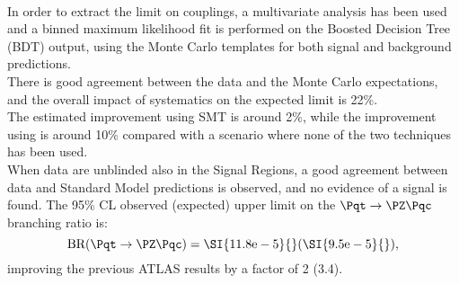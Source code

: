 \vspace{\baselineskip}
\\In order to extract the limit on \tZc couplings, a multivariate analysis has been used and a binned maximum likelihood fit is performed on the Boosted Decision Tree (BDT) output, using the Monte Carlo templates for both signal and background predictions.\\
There is good agreement between the data and the Monte Carlo expectations, 
and the overall impact of systematics on the expected limit is 22\%.\\
The estimated improvement using SMT is around 2\%, while the improvement using \DLrc is around 10\% compared with a scenario where none of the two techniques has been used.
\vspace{\baselineskip}
\\When data are unblinded also in the Signal Regions, a good agreement between data and Standard Model predictions is observed, and no evidence of a signal is found. The 95\% CL observed (expected) upper limit on the $\Pqt\rightarrow\PZ\Pqc$ branching ratio is:
\begin{equation*}
\mathrm{BR (\Pqt\rightarrow\PZ\Pqc)=\SI{11.8e-5}{}(\SI{9.5e-5}{})},
\end{equation*}
improving the previous ATLAS results by a factor of 2 (3.4).

